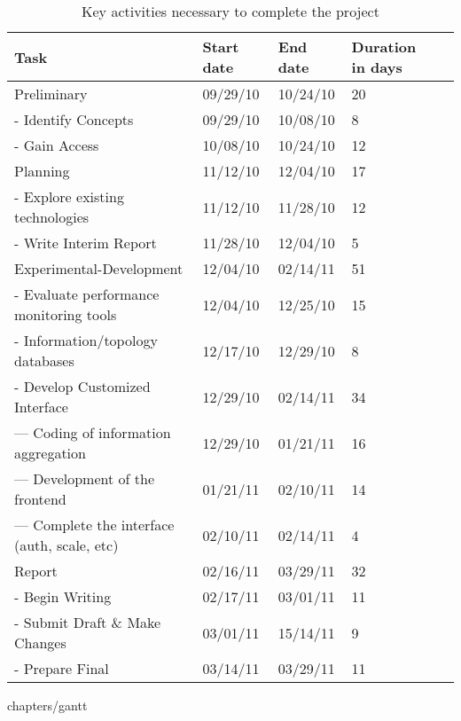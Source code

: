 \begin{table}[ht]
\begin{tabular}{ | l | l | l | l | r |}
\hline
Task & Start date & End date & Duration in days \\ \hline
  Preliminary & 09/29/10 & 10/24/10 & 20 \\ \hline 
  -  Identify Concepts & 09/29/10 & 10/08/10 & 8 \\ \hline 
  -  Gain Access & 10/08/10 & 10/24/10 & 12 \\ \hline 
  Planning & 11/12/10 & 12/04/10 & 17 \\ \hline 
  -  Explore existing technologies & 11/12/10 & 11/28/10 & 12 \\ \hline 
  -  Write Interim Report & 11/28/10 & 12/04/10 & 5 \\ \hline 
  Experimental-Development & 12/04/10 & 02/14/11 & 51 \\ \hline 
  -  Evaluate performance monitoring tools & 12/04/10 & 12/25/10 & 15 \\ \hline 
  -  Information/topology databases & 12/17/10 & 12/29/10 & 8 \\ \hline 
  -  Develop Customized Interface & 12/29/10 & 02/14/11 & 34 \\ \hline 
  ---    Coding of information aggregation & 12/29/10 & 01/21/11 & 16 \\ \hline 
  ---    Development of the frontend & 01/21/11 & 02/10/11 & 14 \\ \hline 
  ---    Complete the interface (auth, scale, etc) & 02/10/11 & 02/14/11 & 4 \\
      \hline Report & 02/16/11 & 03/29/11 & 32 \\ \hline 
  -  Begin Writing & 02/17/11 & 03/01/11 & 11 \\ \hline 
  -  Submit Draft \& Make Changes & 03/01/11 & 15/14/11 & 9 \\ \hline 
  -  Prepare Final & 03/14/11 & 03/29/11 & 11 \\ \hline 
\end{tabular}
\caption{Key activities necessary to complete the project}
\label{tab:tasks}
\end{table}

 {chapters/gantt}
